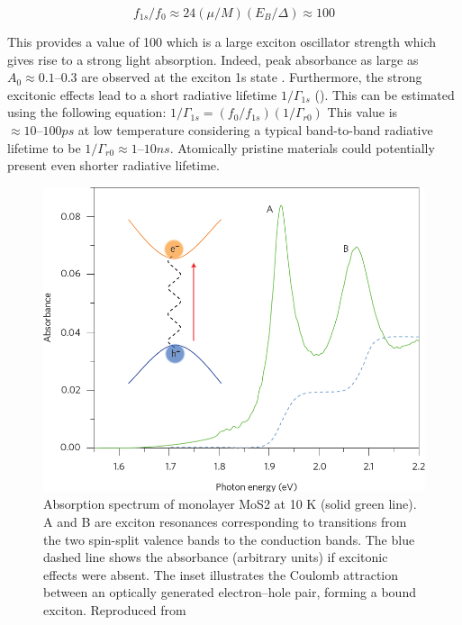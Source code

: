 \begin{equation}
f_{1s}/f_0 \approx 24({\mu}/M)(E_B/{\Delta}) \approx 100
\end{equation} 
 
This provides a value of 100 which is a large exciton oscillator strength which gives rise to a strong light absorption. Indeed, peak absorbance as large as $A_0 \approx 0.1–0.3$ are observed at the exciton 1s state \cite{AtomicallyThinMoS2ANewDirect-GapSemiconductor}\cite{Mak2012}. Furthermore, the strong excitonic effects lead to a  short radiative lifetime $1/{\Gamma}_{1s}$ (\cite{Feldmann1988}\cite{Haug1989}). This can be estimated using the following equation: $1/{\Gamma}_{1s} = (f_0/f_{1s})(1/{\Gamma}_{r0})$
This value is $\approx 10–100 ps$ at low temperature considering a typical band-to-band radiative lifetime to be $1/{\Gamma}_{r0} \approx 1–10 ns$. Atomically pristine materials could potentially present even shorter radiative lifetime. 


\begin{figure}[!h]
	\begin{center}
		\includegraphics[scale=0.45]{TMDCAbsorption.png}
		\caption{Absorption spectrum of monolayer MoS2 at 10 K (solid green line). A and B are exciton resonances corresponding to transitions from the two spin-split valence bands to the conduction bands. The blue dashed line shows the absorbance (arbitrary units) if excitonic effects were absent. The inset illustrates the Coulomb attraction between an optically generated electron–hole pair, forming a bound exciton. Reproduced from \cite{Mak2016}}
		\label{fig:TMDCAbsorption}
	\end{center}
\end{figure}


